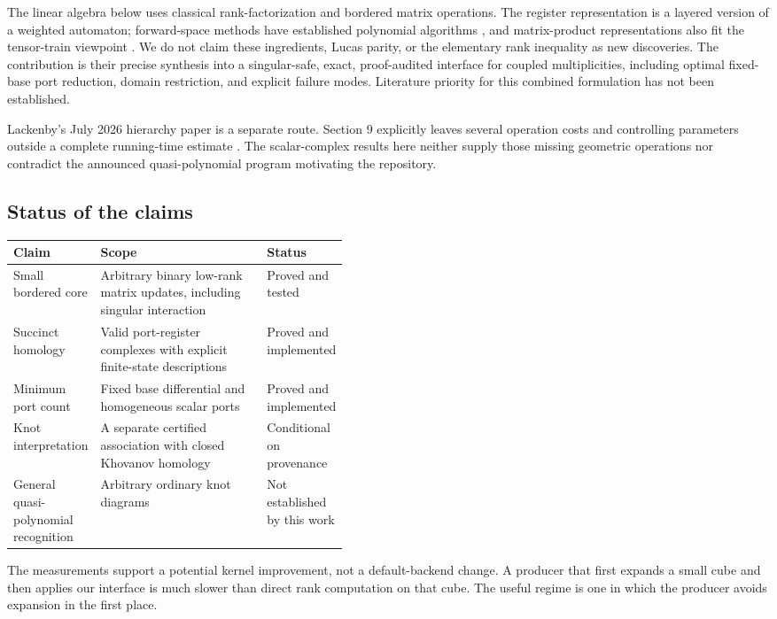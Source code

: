 \documentclass[11pt,letterpaper]{article}
\theoremstyle{definition}
\theoremstyle{remark}
\numberwithin{equation}{section}
\begin{document}
The linear algebra below uses classical rank-factorization and bordered
matrix operations. The register representation is a layered version of a
weighted automaton; forward-space methods have established polynomial
algorithms \cite{kiefer}, and matrix-product representations also fit the
tensor-train viewpoint \cite{oseledets}. We do not claim these ingredients,
Lucas parity, or the elementary rank inequality as new discoveries. The
contribution is their precise synthesis into a singular-safe, exact,
proof-audited interface for coupled multiplicities, including optimal
fixed-base port reduction, domain restriction, and explicit failure modes.
Literature priority for this combined formulation has not been established.

Lackenby's July 2026 hierarchy paper is a separate route. Section 9 explicitly
leaves several operation costs and controlling parameters outside a complete
running-time estimate \cite{lackenby}. The scalar-complex results here neither
supply those missing geometric operations nor contradict the announced
quasi-polynomial program motivating the repository.

\subsection{Status of the claims}
\begin{center}
\begin{tabularx}{\linewidth}{@{}p{0.25\linewidth}Xp{0.19\linewidth}@{}}
\toprule
Claim & Scope & Status\\
\midrule
Small bordered core & Arbitrary binary low-rank matrix updates, including singular interaction & Proved and tested\\
Succinct homology & Valid port-register complexes with explicit finite-state descriptions & Proved and implemented\\
Minimum port count & Fixed base differential and homogeneous scalar ports & Proved and implemented\\
Knot interpretation & A separate certified association with closed Khovanov homology & Conditional on provenance\\
General quasi-polynomial recognition & Arbitrary ordinary knot diagrams & Not established by this work\\
\bottomrule
\end{tabularx}
\end{center}

The measurements support a potential kernel improvement, not a default-backend
change. A producer that first expands a small cube and then applies our
interface is much slower than direct rank computation on that cube. The
useful regime is one in which the producer avoids expansion in the first
place.
\end{document}
